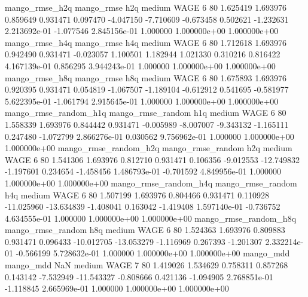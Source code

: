        mango_rmse_h2q        mango_rmse                  h2q     medium     WAGE                 6 80  1.625419       1.693976 0.859649       0.931471    0.097470     -4.047150     -7.710609    -0.673458       0.502621 -1.232631 2.213692e-01    -1.077546   2.845156e-01            1.000000    1.000000e+00        1.000000e+00
       mango_rmse_h4q        mango_rmse                  h4q     medium     WAGE                 6 80  1.712618       1.693976 0.942490       0.931471   -0.023057      1.100501      1.182944     1.021330       0.310216  0.816422 4.167139e-01     0.856295   3.944243e-01            1.000000    1.000000e+00        1.000000e+00
       mango_rmse_h8q        mango_rmse                  h8q     medium     WAGE                 6 80  1.675893       1.693976 0.920395       0.931471    0.054819     -1.067507     -1.189104    -0.612912       0.541695 -0.581977 5.622395e-01    -1.061794   2.915645e-01            1.000000    1.000000e+00        1.000000e+00
mango_rmse_random_h1q mango_rmse_random                  h1q     medium     WAGE                 6 80  1.558339       1.693976 0.844442       0.931471   -0.005989     -8.007007     -9.343132    -1.165111       0.247480 -1.072799 2.866276e-01     0.030562   9.756962e-01            1.000000    1.000000e+00        1.000000e+00
mango_rmse_random_h2q mango_rmse_random                  h2q     medium     WAGE                 6 80  1.541306       1.693976 0.812710       0.931471    0.106356     -9.012553    -12.749832    -1.197601       0.234654 -1.458456 1.486793e-01    -0.701592   4.849956e-01            1.000000    1.000000e+00        1.000000e+00
mango_rmse_random_h4q mango_rmse_random                  h4q     medium     WAGE                 6 80  1.507199       1.693976 0.804466       0.931471    0.110928    -11.025960    -13.634839    -1.408041       0.163042 -1.419408 1.597140e-01    -0.736752   4.634555e-01            1.000000    1.000000e+00        1.000000e+00
mango_rmse_random_h8q mango_rmse_random                  h8q     medium     WAGE                 6 80  1.524363       1.693976 0.809883       0.931471    0.096433    -10.012705    -13.053279    -1.116969       0.267393 -1.201307 2.332214e-01    -0.566199   5.728632e-01            1.000000    1.000000e+00        1.000000e+00
            mango_mdd         mango_mdd                  NaN     medium     WAGE                 7 80  1.419026       1.534629 0.758311       0.857268    0.143142     -7.532949    -11.543327    -0.808666       0.421136 -1.094905 2.768851e-01    -1.118845   2.665969e-01            1.000000    1.000000e+00        1.000000e+00
